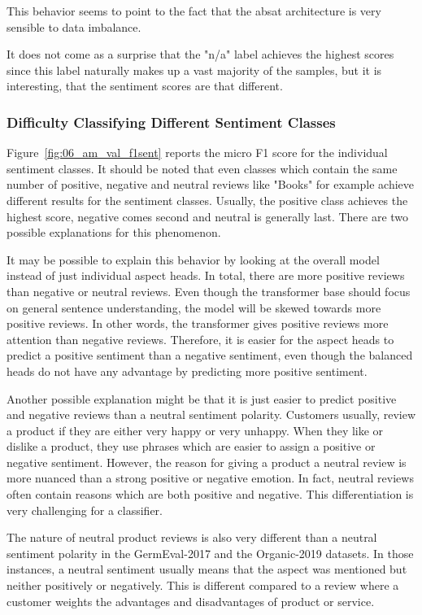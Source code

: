 This behavior seems to point to the fact that the \gls{absat} architecture is very sensible to data imbalance.


It does not come as a surprise that the "n/a" label achieves the highest scores since this label naturally makes up a vast majority of the samples, but it is interesting, that the sentiment scores are that different.

\subsubsection*{Difficulty Classifying Different Sentiment Classes}

Figure~\ref{fig:06_am_val_f1sent} reports the micro F1 score for the individual sentiment classes. It should be noted that even classes which contain the same number of positive, negative and neutral reviews like "Books" for example achieve different results for the sentiment classes. Usually, the positive class achieves the highest score, negative comes second and neutral is generally last. There are two possible explanations for this phenomenon.
\smallskip

It may be possible to explain this behavior by looking at the overall model instead of just individual aspect heads. In total, there are more positive reviews than negative or neutral reviews. Even though the transformer base should focus on general sentence understanding, the model will be skewed towards more positive reviews. In other words, the transformer gives positive reviews more attention than negative reviews. Therefore, it is easier for the aspect heads to predict a positive sentiment than a negative sentiment, even though the balanced heads do not have any advantage by predicting more positive sentiment.
\bigskip

Another possible explanation might be that it is just easier to predict positive and negative reviews than a neutral sentiment polarity. Customers usually, review a product if they are either very happy or very unhappy. When they like or dislike a product, they use phrases which are easier to assign a positive or negative sentiment. However, the reason for giving a product a neutral review is more nuanced than a strong positive or negative emotion. In fact, neutral reviews often contain reasons which are both positive and negative. This differentiation is very challenging for a classifier. 
\smallskip

The nature of neutral product reviews is also very different than a neutral sentiment polarity in the GermEval-2017 and the Organic-2019 datasets. In those instances, a neutral sentiment usually means that the aspect was mentioned but neither positively or negatively. This is different compared to a review where a customer weights the advantages and disadvantages of product or service.


